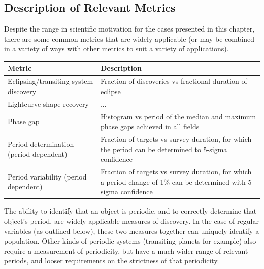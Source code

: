 \subsection{Description of Relevant Metrics}
\label{sec:\chpname:variablemetrics}

Despite the range in scientific motivation for the cases presented
in this chapter,
there are some common metrics that are widely applicable (or may
be combined in a variety of ways with other metrics to suit a variety of
applications).


\begin{center}
\begin{tabular}{| p{5cm} |p{10cm} |}
\hline Metric & Description\\
\hline
Eclipsing/transiting system discovery & Fraction of discoveries vs fractional duration of eclipse\\
Lightcurve shape recovery & ... \\
Phase gap & Histogram vs period of the median and maximum phase gaps achieved in all fields\\
Period determination (period dependent) & Fraction of targets vs survey duration, for which the period can be determined to 5-sigma confidence\\
Period variability (period dependent) & Fraction of targets vs survey duration, for which a period change of 1\% can be determined with 5-sigma confidence\\
  \hline \end{tabular}
 \end{center}

The ability to identify that an object is periodic, and to correctly
determine that object's period, are widely applicable measures of
discovery. In the case of regular variables (as outlined below), these
two measures together can uniquely identify a population. Other kinds of
periodic systems (transiting planets for example) also require a
measurement of periodicity, but have a much wider range of relevant
periods, and looser requirements on the strictness of that periodicity.

